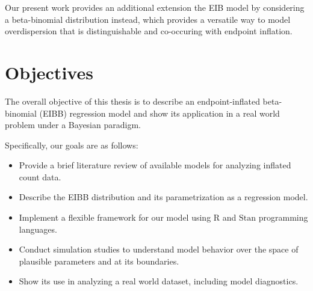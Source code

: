 Our present work provides an additional extension the EIB model by considering a beta-binomial distribution instead, which provides a versatile way to model overdispersion that is distinguishable and co-occuring with endpoint inflation.

\section{Objectives}
\label{sec:introduction_objectives}

The overall objective of this thesis is to describe an endpoint-inflated beta-binomial (EIBB) regression model and show its application in a real world problem under a Bayesian paradigm.

Specifically, our goals are as follows:

\begin{itemize}
\item Provide a brief literature review of available models for analyzing inflated count data.
\item Describe the EIBB distribution and its parametrization as a regression model.
\item Implement a flexible framework for our model using $\text{R}$ and $\text{Stan}$ programming languages.
\item Conduct simulation studies to understand model behavior over the space of plausible parameters and at its boundaries.
\item Show its use in analyzing a real world dataset, including model diagnostics.
\end{itemize}